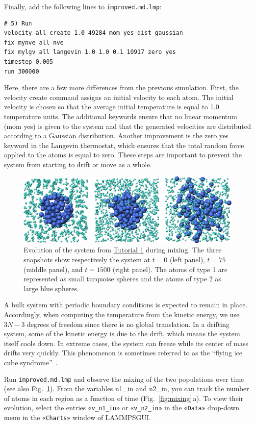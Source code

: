 \documentclass[9pt,tutorial]{livecoms}
\newcommand{\lmpcmd}[1]{\colorbox{listing}{\textcolor{command}{\small{#1}}}} %
\newcommand{\flecmd}[1]{\textcolor{command}{\texttt{#1}}} %
\newcommand{\guicmd}[1]{\textcolor{command}{\texttt{«#1»}}} %
\newcommand{\lammpsgui}{\textsf{LAMMPS\textendash GUI}}
\begin{document}
Finally, add the following lines to \flecmd{improved.md.lmp}:
\begin{lstlisting}
# 5) Run
velocity all create 1.0 49284 mom yes dist gaussian
fix mynve all nve
fix mylgv all langevin 1.0 1.0 0.1 10917 zero yes
timestep 0.005
run 300000
\end{lstlisting}
Here, there are a few more differences from the previous simulation.
First, the \lmpcmd{velocity create} command assigns an initial velocity
to each atom.  The initial velocity is chosen so that the average
initial temperature is equal to 1.0 temperature units.  The additional
keywords ensure that no linear momentum (\lmpcmd{mom yes}) is given to
the system and that the generated velocities are distributed according
to a Gaussian distribution.  Another improvement is the \lmpcmd{zero
  yes} keyword in the Langevin thermostat, which ensures that the total
random force applied to the atoms is equal to zero. These steps are
important to prevent the system from starting to drift or move as a
whole.
\begin{figure}
\centering
\includegraphics[width=\linewidth]{LJ-evolution}
\caption{Evolution of the system from \hyperref[lennard-jones-label]{Tutorial 1}
during mixing.  The three snapshots show respectively the system
at $t=0$ (left panel), $t=75$ (middle panel), and $t=1500$ (right panel).  The
atoms of type 1 are represented as small turquoise spheres and the atoms of type 2
as large blue spheres.}
\label{fig:evolution-population}
\end{figure}

\begin{note}
  A bulk system with periodic boundary conditions is expected to remain
  in place.  Accordingly, when computing the temperature from the
  kinetic energy, we use $3N-3$ degrees of freedom since there is no
  global translation.  In a drifting system, some of the kinetic energy
  is due to the drift, which means the system itself cools down.  In
  extreme cases, the system can freeze while its center of mass drifts
  very quickly.  This phenomenon is sometimes referred to as the
  ``flying ice cube syndrome''~\cite{wong2016good}.
\end{note}
Run \flecmd{improved.md.lmp} and observe the mixing of the two populations
over time (see also Fig.~\ref{fig:evolution-population}).  From the
variables \lmpcmd{n1\_in} and \lmpcmd{n2\_in}, you can track the number
of atoms in each region as a function of time
(Fig.~\ref{fig:mixing}\,a).  To view their evolution, select the entries
\guicmd{v\_n1\_in} or \guicmd{v\_n2\_in} in the \guicmd{Data} drop-down
menu in the \guicmd{Charts} window of \lammpsgui{}.
\end{document}
